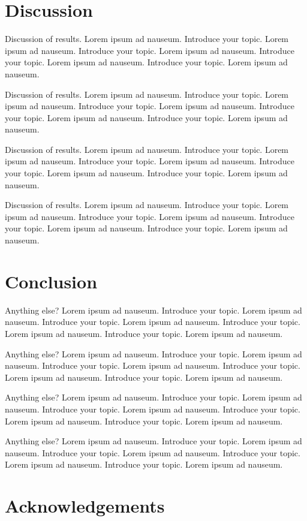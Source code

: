 \documentclass{bioinfo}
\begin{document}
\section{Discussion}

Discussion of results. Lorem ipsum ad nauseum. Introduce your topic.
Lorem ipsum ad nauseum. Introduce your topic. Lorem ipsum ad nauseum.
Introduce your topic. Lorem ipsum ad nauseum. Introduce your topic.
Lorem ipsum ad nauseum.

Discussion of results. Lorem ipsum ad nauseum. Introduce your topic.
Lorem ipsum ad nauseum. Introduce your topic. Lorem ipsum ad nauseum.
Introduce your topic. Lorem ipsum ad nauseum. Introduce your topic.
Lorem ipsum ad nauseum.

Discussion of results. Lorem ipsum ad nauseum. Introduce your topic.
Lorem ipsum ad nauseum. Introduce your topic. Lorem ipsum ad nauseum.
Introduce your topic. Lorem ipsum ad nauseum. Introduce your topic.
Lorem ipsum ad nauseum.

Discussion of results. Lorem ipsum ad nauseum. Introduce your topic.
Lorem ipsum ad nauseum. Introduce your topic. Lorem ipsum ad nauseum.
Introduce your topic. Lorem ipsum ad nauseum. Introduce your topic.
Lorem ipsum ad nauseum.

\section{Conclusion}

Anything else? Lorem ipsum ad nauseum. Introduce your topic. Lorem ipsum
ad nauseum. Introduce your topic. Lorem ipsum ad nauseum. Introduce your
topic. Lorem ipsum ad nauseum. Introduce your topic. Lorem ipsum ad
nauseum.

Anything else? Lorem ipsum ad nauseum. Introduce your topic. Lorem ipsum
ad nauseum. Introduce your topic. Lorem ipsum ad nauseum. Introduce your
topic. Lorem ipsum ad nauseum. Introduce your topic. Lorem ipsum ad
nauseum.

Anything else? Lorem ipsum ad nauseum. Introduce your topic. Lorem ipsum
ad nauseum. Introduce your topic. Lorem ipsum ad nauseum. Introduce your
topic. Lorem ipsum ad nauseum. Introduce your topic. Lorem ipsum ad
nauseum.

Anything else? Lorem ipsum ad nauseum. Introduce your topic. Lorem ipsum
ad nauseum. Introduce your topic. Lorem ipsum ad nauseum. Introduce your
topic. Lorem ipsum ad nauseum. Introduce your topic. Lorem ipsum ad
nauseum.

\section*{Acknowledgements}
\end{document}
